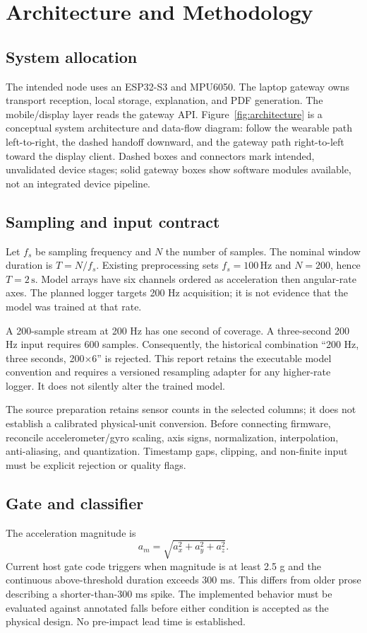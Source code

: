 \chapter{Architecture and Methodology}
\section{System allocation}
The intended node uses an ESP32-S3 and MPU6050. The laptop gateway owns transport reception, local storage, explanation, and PDF generation. The mobile/display layer reads the gateway API. Figure~\ref{fig:architecture} is a conceptual system architecture and data-flow diagram: follow the wearable path left-to-right, the dashed handoff downward, and the gateway path right-to-left toward the display client. Dashed boxes and connectors mark intended, unvalidated device stages; solid gateway boxes show software modules available, not an integrated device pipeline.


\section{Sampling and input contract}
Let $f_s$ be sampling frequency and $N$ the number of samples. The nominal window duration is $T=N/f_s$. Existing preprocessing sets $f_s=100\,\mathrm{Hz}$ and $N=200$, hence $T=2\,\mathrm{s}$. Model arrays have six channels ordered as acceleration then angular-rate axes. The planned logger targets 200 Hz acquisition; it is not evidence that the model was trained at that rate.

A 200-sample stream at 200 Hz has one second of coverage. A three-second 200 Hz input requires 600 samples. Consequently, the historical combination ``200 Hz, three seconds, 200$\times$6'' is rejected. This report retains the executable model convention and requires a versioned resampling adapter for any higher-rate logger. It does not silently alter the trained model.

The source preparation retains sensor counts in the selected columns; it does not establish a calibrated physical-unit conversion. Before connecting firmware, reconcile accelerometer/gyro scaling, axis signs, normalization, interpolation, anti-aliasing, and quantization. Timestamp gaps, clipping, and non-finite input must be explicit rejection or quality flags.

\section{Gate and classifier}
The acceleration magnitude is
\[
 a_m=\sqrt{a_x^2+a_y^2+a_z^2}.
\]
Current host gate code triggers when magnitude is at least 2.5 g and the continuous above-threshold duration exceeds 300 ms. This differs from older prose describing a shorter-than-300 ms spike. The implemented behavior must be evaluated against annotated falls before either condition is accepted as the physical design. No pre-impact lead time is established.

